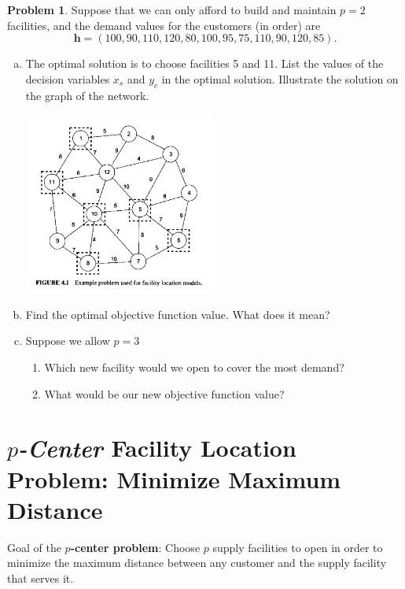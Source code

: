 \documentclass[11pt]{article}
\theoremstyle{definition}
\newtheorem{problem}{Problem}
\begin{document}
\begin{problem}
Suppose that we can only afford to build and maintain $p = 2$ facilities, and the demand values for the customers (in order) are 
\[
\textbf{h} = (100, 90, 110, 120, 80, 100, 95, 75, 110, 90, 120, 85).
\]
\end{problem}

\begin{enumerate}[(a)]
\item The optimal solution is to choose facilities 5 and 11.  List the values of the decision variables $x_s$ and $y_c$ in the optimal solution.  Illustrate the solution on the graph of the network.

\hfill \includegraphics[width = 0.5\textwidth]{facloc}

\item Find the optimal objective function value.  What does it mean? \vspace{2cm}
	

\item Suppose we allow $p = 3$
\begin{enumerate}[i]
\item Which new facility would we open to cover the most demand?

\vfill 
\item What would be our new objective function value?

\vfill 


\end{enumerate}
\end{enumerate}

\newpage

\section{\emph{$p$-Center} Facility Location Problem:  Minimize Maximum Distance}

Goal of the \textbf{$p$-center problem}: Choose $p$ supply facilities to open in order to minimize the maximum distance between any customer and the supply facility that serves it.
\end{document}
